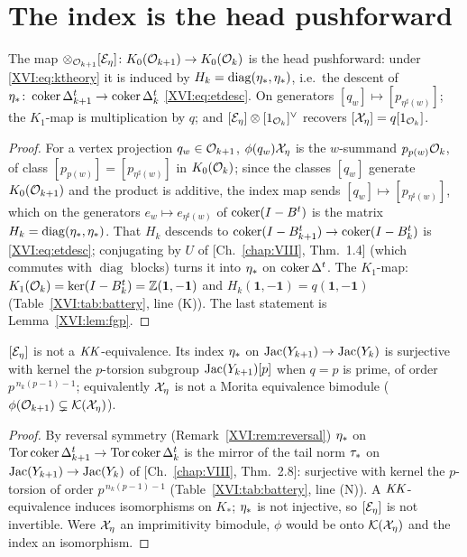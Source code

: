 \section{The index is the head pushforward}\label{XVI:sec:index}

\begin{theorem}\label{XVI:thm:index}
The map $\otimes_{\mathcal{O}_{k+1}}[\mathcal{E}_\eta]\colon K_0(\mathcal{O}_{k+1})\to K_0(\mathcal{O}_k)$ is the head
pushforward: under \eqref{XVI:eq:ktheory} it is induced by $H_k=\operatorname{diag}(\eta_*,\eta_*)$,
i.e.\ the descent of $\eta_*\colon\operatorname{coker}\Delta_{k+1}^{t}\to\operatorname{coker}\Delta_k^{t}$
\eqref{XVI:eq:etdesc}. On generators $[q_w]\mapsto[p_{\eta^{\sharp}(w)}]$; the $K_1$-map is
multiplication by $q$; and $[\mathcal{E}_\eta]\otimes[1_{\mathcal{O}_k}]^{\vee}$ recovers
$[\mathcal{X}_\eta]=q[1_{\mathcal{O}_k}]$.
\end{theorem}

\begin{proof}
For a vertex projection $q_w\in\mathcal{O}_{k+1}$, $\phi(q_w)\mathcal{X}_\eta$ is the $w$-summand
$p_{p(w)}\mathcal{O}_k$, of class $[p_{p(w)}]=[p_{\eta^{\sharp}(w)}]$ in $K_0(\mathcal{O}_k)$; since the
classes $[q_w]$ generate $K_0(\mathcal{O}_{k+1})$ and the product is additive, the index map sends
$[q_w]\mapsto[p_{\eta^{\sharp}(w)}]$, which on the generators $e_w\mapsto e_{\eta^{\sharp}(w)}$
of $\operatorname{coker}(I-B^{t})$ is the matrix $H_k=\operatorname{diag}(\eta_*,\eta_*)$. That $H_k$ descends to
$\operatorname{coker}(I-B_{k+1}^{t})\to\operatorname{coker}(I-B_k^{t})$ is \eqref{XVI:eq:etdesc}; conjugating by $U$ of
[Ch.~\ref{chap:VIII}, Thm.~1.4] (which commutes with $\operatorname{diag}$ blocks) turns it into $\eta_*$ on
$\operatorname{coker}\Delta^{t}$. The $K_1$-map: $K_1(\mathcal{O}_k)=\ker(I-B_k^{t})=\mathbb{Z}(\mathbf1,-\mathbf1)$ and
$H_k(\mathbf1,-\mathbf1)=q(\mathbf1,-\mathbf1)$ (Table~\ref{XVI:tab:battery}, line (K)). The last
statement is Lemma~\ref{XVI:lem:fgp}.
\end{proof}

\begin{proposition}\label{XVI:prop:notinv}
$[\mathcal{E}_\eta]$ is not a $\mathit{KK}$-equivalence. Its index $\eta_*$ on $\operatorname{Jac}(Y_{k+1})\to\operatorname{Jac}(Y_k)$ is
surjective with kernel the $p$-torsion subgroup $\operatorname{Jac}(Y_{k+1})[p]$ when $q=p$ is prime, of
order $p^{\,n_k(p-1)-1}$; equivalently $\mathcal{X}_\eta$ is not a Morita equivalence bimodule
($\phi(\mathcal{O}_{k+1})\subsetneq\mathcal{K}(\mathcal{X}_\eta)$).
\end{proposition}

\begin{proof}
By reversal symmetry (Remark~\ref{XVI:rem:reversal}) $\eta_*$ on $\operatorname{Tor}\operatorname{coker}\Delta_{k+1}^{t}\to
\operatorname{Tor}\operatorname{coker}\Delta_k^{t}$ is the mirror of the tail norm $\tau_*$ on $\operatorname{Jac}(Y_{k+1})\to\operatorname{Jac}(Y_k)$
of [Ch.~\ref{chap:VIII}, Thm.~2.8]: surjective with kernel the $p$-torsion of order $p^{\,n_k(p-1)-1}$
(Table~\ref{XVI:tab:battery}, line (N)). A $\mathit{KK}$-equivalence induces isomorphisms on $K_*$;
$\eta_*$ is not injective, so $[\mathcal{E}_\eta]$ is not invertible. Were $\mathcal{X}_\eta$ an
imprimitivity bimodule, $\phi$ would be onto $\mathcal{K}(\mathcal{X}_\eta)$ and the index an isomorphism.
\end{proof}

